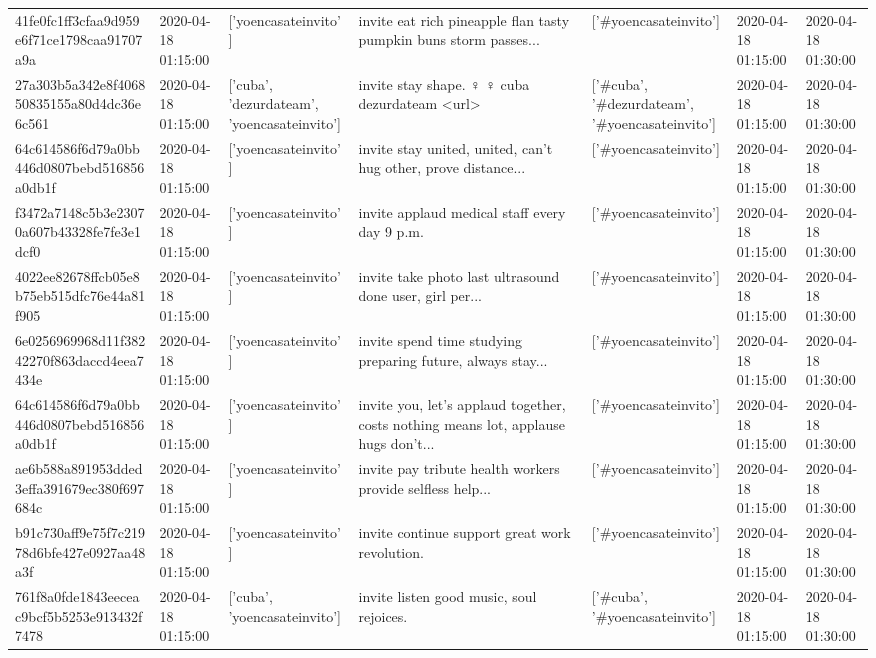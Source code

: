 \begin{tabular}{lllllll}
41fe0fc1ff3cfaa9d959e6f71ce1798caa91707a9a & 2020-04-18 01:15:00 & ['yoencasateinvito'] & invite eat rich pineapple flan tasty pumpkin buns storm passes... & ['#yoencasateinvito'] & 2020-04-18 01:15:00 & 2020-04-18 01:30:00 \\
27a303b5a342e8f406850835155a80d4dc36e6c561 & 2020-04-18 01:15:00 & ['cuba', 'dezurdateam', 'yoencasateinvito'] & invite stay shape. ♀️ ♀️ cuba dezurdateam <url> & ['#cuba', '#dezurdateam', '#yoencasateinvito'] & 2020-04-18 01:15:00 & 2020-04-18 01:30:00 \\
64c614586f6d79a0bb446d0807bebd516856a0db1f & 2020-04-18 01:15:00 & ['yoencasateinvito'] & invite stay united, united, can't hug other, prove distance... & ['#yoencasateinvito'] & 2020-04-18 01:15:00 & 2020-04-18 01:30:00 \\
f3472a7148c5b3e23070a607b43328fe7fe3e1dcf0 & 2020-04-18 01:15:00 & ['yoencasateinvito'] & invite applaud medical staff every day 9 p.m. & ['#yoencasateinvito'] & 2020-04-18 01:15:00 & 2020-04-18 01:30:00 \\
4022ee82678ffcb05e8b75eb515dfc76e44a81f905 & 2020-04-18 01:15:00 & ['yoencasateinvito'] & invite take photo last ultrasound done user, girl per... & ['#yoencasateinvito'] & 2020-04-18 01:15:00 & 2020-04-18 01:30:00 \\
6e0256969968d11f38242270f863daccd4eea7434e & 2020-04-18 01:15:00 & ['yoencasateinvito'] & invite spend time studying preparing future, always stay... & ['#yoencasateinvito'] & 2020-04-18 01:15:00 & 2020-04-18 01:30:00 \\
64c614586f6d79a0bb446d0807bebd516856a0db1f & 2020-04-18 01:15:00 & ['yoencasateinvito'] & invite you, let's applaud together, costs nothing means lot, applause hugs don't... & ['#yoencasateinvito'] & 2020-04-18 01:15:00 & 2020-04-18 01:30:00 \\
ae6b588a891953dded3effa391679ec380f697684c & 2020-04-18 01:15:00 & ['yoencasateinvito'] & invite pay tribute health workers provide selfless help... & ['#yoencasateinvito'] & 2020-04-18 01:15:00 & 2020-04-18 01:30:00 \\
b91c730aff9e75f7c21978d6bfe427e0927aa48a3f & 2020-04-18 01:15:00 & ['yoencasateinvito'] & invite continue support great work revolution. & ['#yoencasateinvito'] & 2020-04-18 01:15:00 & 2020-04-18 01:30:00 \\
761f8a0fde1843eeceac9bcf5b5253e913432f7478 & 2020-04-18 01:15:00 & ['cuba', 'yoencasateinvito'] & invite listen good music, soul rejoices. & ['#cuba', '#yoencasateinvito'] & 2020-04-18 01:15:00 & 2020-04-18 01:30:00 \\

\end{tabular}

